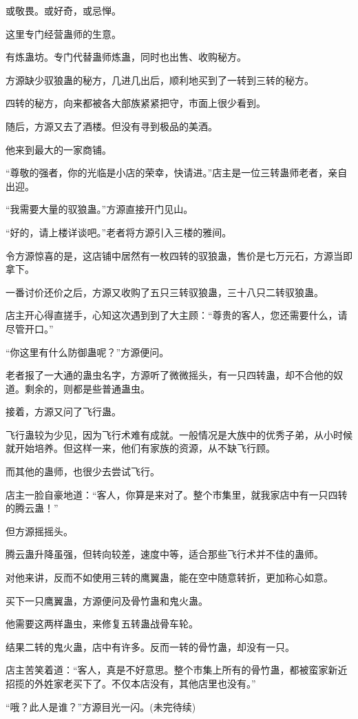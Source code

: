 \begin{this_body}
或敬畏。或好奇，或忌惮。

这里专门经营蛊师的生意。

有炼蛊坊。专门代替蛊师炼蛊，同时也出售、收购秘方。

方源缺少驭狼蛊的秘方，几进几出后，顺利地买到了一转到三转的秘方。

四转的秘方，向来都被各大部族紧紧把守，市面上很少看到。

随后，方源又去了酒楼。但没有寻到极品的美酒。

他来到最大的一家商铺。

“尊敬的强者，你的光临是小店的荣幸，快请进。”店主是一位三转蛊师老者，亲自出迎。

“我需要大量的驭狼蛊。”方源直接开门见山。

“好的，请上楼详谈吧。”老者将方源引入三楼的雅间。

令方源惊喜的是，这店铺中居然有一枚四转的驭狼蛊，售价是七万元石，方源当即拿下。

一番讨价还价之后，方源又收购了五只三转驭狼蛊，三十八只二转驭狼蛊。

店主开心得直搓手，心知这次遇到到了大主顾：“尊贵的客人，您还需要什么，请尽管开口。”

“你这里有什么防御蛊呢？”方源便问。

老者报了一大通的蛊虫名字，方源听了微微摇头，有一只四转蛊，却不合他的奴道。剩余的，则都是些普通蛊虫。

接着，方源又问了飞行蛊。

飞行蛊较为少见，因为飞行术难有成就。一般情况是大族中的优秀子弟，从小时候就开始培养。但这样一来，他们有家族的资源，从不缺飞行顾。

而其他的蛊师，也很少去尝试飞行。

店主一脸自豪地道：“客人，你算是来对了。整个市集里，就我家店中有一只四转的腾云蛊！”

但方源摇摇头。

腾云蛊升降虽强，但转向较差，速度中等，适合那些飞行术并不佳的蛊师。

对他来讲，反而不如使用三转的鹰翼蛊，能在空中随意转折，更加称心如意。

买下一只鹰翼蛊，方源便问及骨竹蛊和鬼火蛊。

他需要这两样蛊虫，来修复五转蛊战骨车轮。

结果二转的鬼火蛊，店中有许多。反而一转的骨竹蛊，却没有一只。

店主苦笑着道：“客人，真是不好意思。整个市集上所有的骨竹蛊，都被蛮家新近招揽的外姓家老买下了。不仅本店没有，其他店里也没有。”

“哦？此人是谁？”方源目光一闪。(未完待续)

\end{this_body}

